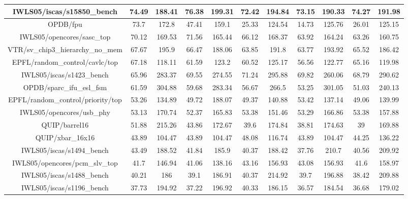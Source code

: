 {\begin{longtable}{|*{11}{c|}}
        \hline
        IWLS05/iscas/s15850\_bench & 74.49 & 188.41 & 76.38 & 199.31 & 72.42 & 194.84 & 73.15 & 190.33 & 74.27 & 191.98 \\
        \hline
        OPDB/fpu & 73.7 & 172.8 & 47.41 & 159.1 & 25.33 & 124.54 & 14.73 & 125.76 & 26.01 & 125.15 \\
        \hline
        IWLS05/opencores/sasc\_top & 70.12 & 169.53 & 71.56 & 165.44 & 66.12 & 168.37 & 63.92 & 164.24 & 63.26 & 160.75 \\
        \hline
        VTR/sv\_chip3\_hierarchy\_no\_mem & 67.67 & 195.9 & 66.47 & 188.06 & 63.85 & 191.8 & 63.77 & 193.92 & 65.52 & 186.42 \\
        \hline
        EPFL/random\_control/cavlc/top & 67.18 & 118.11 & 61.59 & 123.2 & 60.52 & 125.17 & 56.56 & 122.77 & 65.16 & 119.98 \\
        \hline
        IWLS05/iscas/s1423\_bench & 65.96 & 283.37 & 69.55 & 274.55 & 71.24 & 295.88 & 69.82 & 260.06 & 68.79 & 290.62 \\
        \hline
        OPDB/sparc\_ifu\_esl\_fsm & 61.59 & 304.88 & 59.68 & 283.34 & 56.67 & 266.5 & 53.25 & 301.05 & 51.03 & 240.13 \\
        \hline
        EPFL/random\_control/priority/top & 53.26 & 134.89 & 49.72 & 188.07 & 49.37 & 140.88 & 53.42 & 137.14 & 49.06 & 139.99 \\
        \hline
        IWLS05/opencores/usb\_phy & 53.13 & 170.74 & 52.37 & 165.83 & 53.38 & 151.46 & 53.29 & 166.86 & 53.38 & 157.88 \\
        \hline
        QUIP/barrel16 & 51.88 & 215.26 & 43.86 & 172.67 & 39.6 & 174.84 & 38.81 & 174.63 & 39 & 169.88 \\
        \hline
        QUIP/xbar\_16x16 & 43.89 & 104.47 & 43.89 & 104.47 & 48.08 & 116.74 & 43.89 & 104.47 & 44.25 & 136.22 \\
        \hline
        IWLS05/iscas/s1494\_bench & 43.49 & 188.52 & 41.84 & 185.9 & 40.37 & 188.42 & 37.76 & 210.7 & 40.56 & 209.92 \\
        \hline
        IWLS05/opencores/pcm\_slv\_top & 41.7 & 146.94 & 41.06 & 138.16 & 43.16 & 156.93 & 43.08 & 156.93 & 41.6 & 158.97 \\
        \hline
        IWLS05/iscas/s1488\_bench & 40.21 & 186 & 39.1 & 186.91 & 40.37 & 214.92 & 39.7 & 196.88 & 38.42 & 209.88 \\
        \hline
        IWLS05/iscas/s1196\_bench & 37.73 & 194.92 & 37.22 & 196.92 & 40.33 & 186.15 & 36.57 & 184.54 & 36.68 & 179.02 \\

\end{longtable}}

